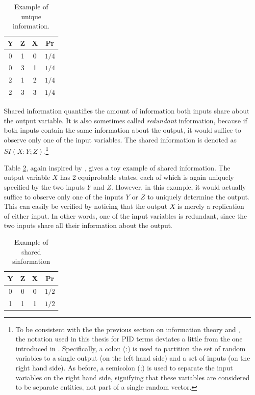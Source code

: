 \documentclass[12pt]{article}
\begin{document}
\begin{table}[h!]
\centering
\begin{tabular}{|c c |c|c|}
	\hline
	Y & Z & X & Pr\\ 
	\hline
	0 & 1 & 0 & $1/4$ \\
	0 & 3 & 1 & $1/4$ \\
	2 & 1 & 2 & $1/4$ \\
	2 & 3 & 3 & $1/4$ \\
	\hline
\end{tabular}
\caption{Example of unique information.}
\label{table:1}
\end{table}

Shared information quantifies the amount of information both inputs share about the output variable. It is also sometimes called \textit{redundant} information, because if both inputs contain the same information about the output, it would suffice to observe only one of the input variables. The shared information is denoted as $SI(X:Y;Z)$.\footnote{To be consistent with the the previous section on information theory and \cite{cover-thomas}, the notation used in this thesis for PID terms deviates a little from the one introduced in \cite{bertschinger}. Specifically, a colon (:) is used to partition the set of random variables to a single output (on the left hand side) and a set of inputs (on the right hand side). As before, a semicolon (;) is used to separate the input variables on the right hand side, signifying that these variables are considered to be separate entities, not part of a single random vector.}

Table \ref{table:2}, again inspired by \cite{pid-synergy}, gives a toy example of shared information. The output variable $X$ has 2 equiprobable states, each of which is again uniquely specified by the two inputs $Y$ and $Z$. However, in this example, it would actually suffice to observe only one of the inputs $Y$ or $Z$ to uniquely determine the output. This can easily be verified by noticing that the output $X$ is merely a replication of either input. In other words, one of the input variables is redundant, since the two inputs share all their information about the output.

\begin{table}[h!]
\centering
\begin{tabular}{|c c |c|c|}
	\hline
	Y & Z & X & Pr\\ 
	\hline
	0 & 0 & 0 & $1/2$\\
	1 & 1 & 1 & $1/2$\\ 
	\hline
\end{tabular}
\caption{Example of shared sinformation}
\label{table:2}
\end{table}
\end{document}
